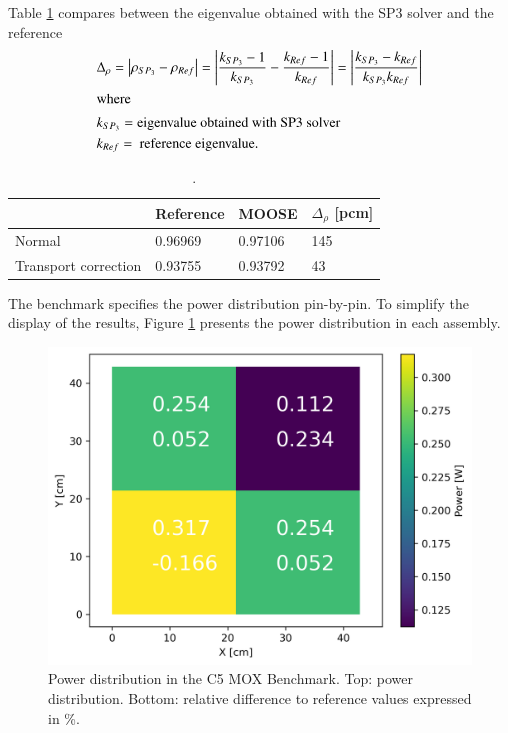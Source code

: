 \documentclass{anstrans}
\begin{document}
Table \ref{tab:keff} compares between the eigenvalue obtained with the SP3 solver and the reference
\begin{align}
  & \Delta_\rho = \left| \rho_{SP_3} - \rho_{Ref} \right| = \left| \frac{k_{SP_3}-1}{k_{SP_3}} - \frac{k_{Ref}-1}{k_{Ref}} \right| = \left| \frac{k_{SP_3}-k_{Ref}}{k_{SP_3} k_{Ref}} \right| \label{eq:delta-rho} \\
  \intertext{where}
  & k_{SP_3} = \mbox{eigenvalue obtained with SP3 solver} \notag \\
  & k_{Ref} = \mbox{ reference eigenvalue.} \notag
\end{align}

\begin{table}[]
	\centering
	\caption{.}
	\label{tab:keff}
	\begin{tabular}{llll}
	\toprule
							& Reference & MOOSE 	& $\Delta_{\rho}$ [pcm]	\\
	\midrule
	Normal 					& 0.96969	& 0.97106	& 145					\\
	Transport correction 	& 0.93755	& 0.93792	& 43					\\
	\bottomrule
	\end{tabular}
\end{table}

The benchmark specifies the power distribution pin-by-pin.
To simplify the display of the results, Figure \ref{fig:power-distrib} presents the power distribution in each assembly.

\begin{figure}[htbp!] %
    \centering
    \includegraphics[width=0.95\linewidth]{figures/distrib.png}
    \hfill
    \caption{Power distribution in the C5 MOX Benchmark. Top: power distribution. Bottom: relative difference to reference values expressed in \%.}
    \label{fig:power-distrib}
\end{figure}
\end{document}

